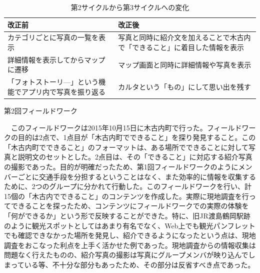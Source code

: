 \begin{table}[htb]
\centering
\addtocounter{table}{+0}
\caption{第2サイクルから第3サイクルへの変化}
  \begin{tabular}{|l|l|} \hline
    改正前&改正後  \\ \hline 
    \parbox{20zw}{カテゴリごとに写真の一覧を表示} & \parbox{20zw}{写真と同時に紹介文を加えることで木古内で「できること」に着目した情報を表示}\rule[-6mm]{0mm}{14mm} \\  \hline
    \parbox{20zw}{詳細情報を表示してからマップに遷移} &\parbox{20zw}{マップ画面と同時に詳細情報や写真を表示}\\ \hline
    \parbox{20zw}{「フォトストーリ—」という機能でアプリ内で写真を振り返る}\rule[-6mm]{0mm}{14mm} & \parbox{20zw}{カルタという「もの」にして思い出を残す}\\ \hline
  \end{tabular} 
\end{table}

\begin{description}
\item[第2回フィールドワーク]\mbox{}
\end{description}
　このフィールドワークは2015年10月15日に木古内町で行った。フィールドワークの目的は2点で、1点目が「木古内町でできること」を探り発見すること。この「木古内町でできること」のフォーマットは、ある場所でできることに対して写真と説明文のセットとした。2点目は、その「できること」に対応する紹介写真の撮影であった。目的が明確だったため、第1回フィールドワークのようにメンバーごとに交通手段を分担するということはなく、また効率的に情報を収集するために、2つのグループに分かれて行動した。このフィールドワークを行い、計15個の「木古内でできること」のコンテンツを作成した。実際に現地調査を行ってできることを探ったため、コンテンツにフィールドワークでの実際の体験を「何ができるか」という形で反映することができた。特に、旧JR渡島鶴岡駅跡のように観光スポットとしてはあまり有名でなく、Web上でも観光パンフレットでも確認できなかった場所を発見し、紹介できるようになったという点は、現地調査をおこなった利点を上手く活かせた例であった。現地調査からの情報収集は問題なく行えたものの、紹介写真の撮影は写真にグループメンバが映り込んでしまっている等、不十分な部分もあったため、その部分は反省すべき点であった。

